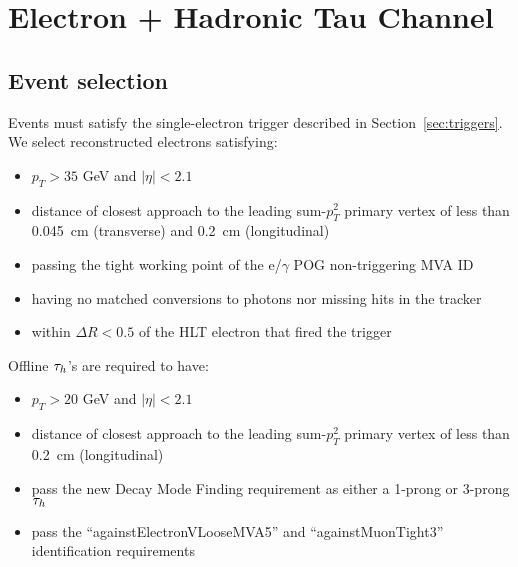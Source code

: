 \section{Electron + Hadronic Tau Channel}\label{sec:eTauhad}


\subsection{Event selection}\label{sec:et_selection}


Events must satisfy the single-electron trigger described in
Section~\ref{sec:triggers}.  We select reconstructed electrons
satisfying:
\begin{itemize}
  \item $p_T>35$ GeV and $\vert\eta\vert<2.1$
  \item distance of closest approach to the leading 
sum-$p_T^2$ primary vertex of less than 0.045~cm 
(transverse) and 0.2~cm (longitudinal)
  \item passing the tight working point of the e/$\gamma$ 
POG non-triggering MVA ID
  \item having no matched conversions to photons nor missing hits in the tracker
  \item within $\Delta R<0.5$ of the HLT electron that fired the trigger

\end{itemize}


Offline $\tau_h$'s are required to have:
\begin{itemize}
  \item $p_{T}> 20$ GeV and $\vert \eta \vert < 2.1$
  \item distance of closest approach to the leading
sum-$p_T^2$ primary vertex of less than 0.2~cm (longitudinal)
  \item pass the new Decay Mode Finding requirement as 
either a 1-prong or 3-prong $\tau_h$
  \item pass the ``againstElectronVLooseMVA5'' and
``againstMuonTight3'' identification requirements
\end{itemize}

